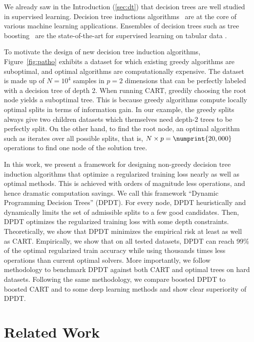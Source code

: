 We already saw in the Introduction (\ref{sec:dt}) that decision trees are well studied in supervised learning.
Decision tree inductions algorithms~\cite{ID3,c45,breiman1984classification} are at the core of various machine learning applications. 
Ensembles of decision trees such as tree boosting~\cite{stcohFriedman,FriedmanBoosting,xgb,10.5555/3327757.3327770} are the state-of-the-art for supervised learning on tabular data \cite{grinsztajn2022tree}.

To motivate the design of new decision tree induction algorithms, Figure~\ref{fig:patho} exhibits a dataset for which existing greedy algorithms are suboptimal, and optimal algorithms are computationally expensive. 
The dataset is made up of $N=10^4$ samples in $p=2$ dimensions that can be perfectly labeled with a decision tree of depth 2. When running CART, greedily choosing the root node yields a suboptimal tree.
This is because greedy algorithms compute locally optimal splits in terms of information gain. In our example, the greedy splits always give two children datasets which themselves need depth-2 trees to be perfectly split.
On the other hand, to find the root node, an optimal algorithm such as \cite{quantbnb} iterates over all possible splits, that is, $N\times p=\numprint{20,000}$ operations to find one node of the solution tree.

In this work, we present a framework for designing non-greedy decision tree induction algorithms that optimize a regularized training loss nearly as well as optimal methods. This is achieved with orders of magnitude less operations, and hence dramatic computation savings.
We call this framework ``Dynamic Programming Decision Trees'' (DPDT). For every node, DPDT heuristically and dynamically limits the set of admissible splits to a few good candidates. Then, DPDT optimizes the regularized training loss with some depth constraints.
Theoretically, we show that DPDT minimizes the empirical risk at least as well as CART\@.
Empirically, we show that on all tested datasets, DPDT can reach 99\% of the optimal regularized train accuracy while using thousands times less operations than current optimal solvers. 
More importantly, we follow \cite{grinsztajn2022tree} methodology to benchmark DPDT against both CART and optimal trees on hard datasets. Following the same methodology, we compare boosted DPDT \cite{FREUND1997119} to boosted CART and to some deep learning methods and show clear superiority of DPDT.

\section{Related Work}

